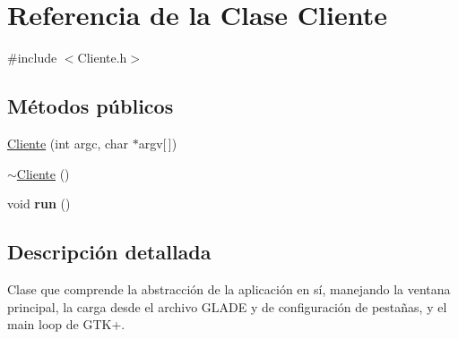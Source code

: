 \hypertarget{classCliente}{\section{\-Referencia de la \-Clase \-Cliente}
\label{classCliente}
}


{\ttfamily \#include $<$\-Cliente.\-h$>$}

\subsection*{\-Métodos públicos}
\begin{DoxyCompactItemize}
\item 
\hyperlink{classCliente_a7d6782c1e479070bdd8c61a6f027ed19}{\-Cliente} (int argc, char $\ast$argv\mbox{[}$\,$\mbox{]})
\item 
\hyperlink{classCliente_a29d1d53394350c66363109e33c990b58}{$\sim$\-Cliente} ()
\item 
\hypertarget{classCliente_a14eb8dac2c8fd77e943fd09640bd38ee}{void {\bfseries run} ()}\label{classCliente_a14eb8dac2c8fd77e943fd09640bd38ee}

\end{DoxyCompactItemize}


\subsection{\-Descripción detallada}
\-Clase que comprende la abstracción de la aplicación en sí, manejando la ventana principal, la carga desde el archivo \-G\-L\-A\-D\-E y de configuración de pestañas, y el main loop de \-G\-T\-K+. 

